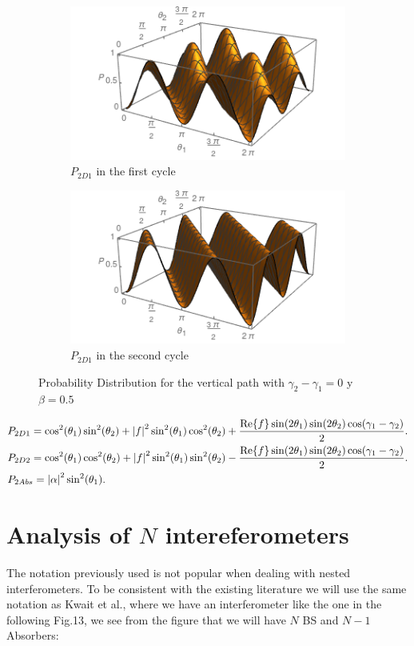 \documentclass[12pt]{book}
\begin{document}
\begin{figure}[!h]
\begin{subfigure}[b]{0.40\linewidth}
\includegraphics[width=\linewidth,height=3 cm]{images/pcd11.png}
\caption{$P_{2D1} $ in the first cycle}
\label{fig:westminster_aerea}
\end{subfigure}
\begin{subfigure}[b]{0.40\linewidth}
\includegraphics[width=\linewidth,height=3 cm]{images/pcd12.png}
\caption{$P_{2D1} $ in the second cycle }
\label{fig:BS1}
\end{subfigure}
\caption{Probability Distribution for the vertical path with  $\gamma_{2}-\gamma_{1}=0 $ y $\beta=0.5$}
\label{fig:westminster}
\end{figure}

\begin{align}
&P_{2D1}=\cos^2(\theta_{1})\sin^2(\theta_{2})+\abs{f}^2 \sin^2(\theta_{1})\cos^2(\theta_{2})+\frac{\Re{f} \sin(2\theta_{1})\sin(2\theta_{2})\cos(\gamma_{1}-\gamma_{2})}{2}.\\
&P_{2D2}=\cos^2(\theta_{1})\cos^2(\theta_{2})+ \abs{f}^2 \sin^2(\theta_{1})\sin^2(\theta_{2})-\frac{\Re{f} \sin(2\theta_{1})\sin(2\theta_{2})\cos(\gamma_{1}-\gamma_{2})}{2}.\\
&P_{2Abs}=\abs{\alpha}^2 \sin^2(\theta_{1}).
\end{align}



\newpage


\section{Analysis of $N$ intereferometers }
 
 The notation previously used is not popular when dealing with nested interferometers. To be consistent with the existing literature we will use the same notation as Kwait et al.\cite{5}, where we have an interferometer  like the one in the following Fig.13, we see from the figure that we will have $N$ BS and $N-1$ Absorbers:
 
\end{document}
